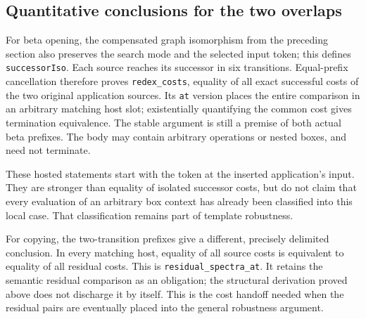 
\subsection{Quantitative conclusions for the two overlaps}
For beta opening, the compensated graph isomorphism from the preceding section
also preserves the search mode and the selected input token; this defines
\texttt{successorIso}. Each source reaches its successor in six transitions.
Equal-prefix cancellation therefore proves \texttt{redex\_costs}, equality of
all exact successful costs of the two original application sources. Its
\texttt{at} version places the entire comparison in an arbitrary matching host
slot; existentially quantifying the common cost gives termination equivalence.
The stable argument is still a premise of both actual beta prefixes. The body
may contain arbitrary operations or nested boxes, and need not terminate.

These hosted statements start with the token at the inserted application's
input. They are stronger than equality of isolated successor costs, but do not
claim that every evaluation of an arbitrary box context has already been
classified into this local case. That classification remains part of template
robustness.


For copying, the two-transition prefixes give a different, precisely delimited
conclusion. In every matching host, equality of all source costs is equivalent
to equality of all residual costs. This is \texttt{residual\_spectra\_at}.
It retains the semantic residual comparison as an obligation; the structural
derivation proved above does not discharge it by itself. This is the cost
handoff needed when the residual pairs are eventually placed into the general
robustness argument.


